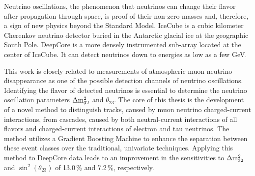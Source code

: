 
Neutrino oscillations, the phenomenon that neutrinos can change their flavor after propagation through space, is proof of their non-zero masses and, therefore, a sign of new physics beyond the Standard Model.
IceCube is a cubic kilometer Cherenkov neutrino detector buried in the Antarctic glacial ice at the geographic South Pole.
DeepCore is a more densely instrumented sub-array located at the center of IceCube.
It can detect neutrinos down to energies as low as a few GeV.

This work is closely related to measurements of atmospheric muon neutrino disappearance as one of the possible detection channels of neutrino oscillations.
Identifying the flavor of detected neutrinos is essential to determine the neutrino oscillation parameters $\Delta \rm{m}^{2}_{32}$ and $\theta_{23}$.
The core of this thesis is the development of a novel method to distinguish tracks, caused by muon neutrino charged-current interactions, from cascades, caused by both neutral-current interactions of all flavors and charged-current interactions of electron and tau neutrinos.
The method utilizes a Gradient Boosting Machine to enhance the separation between these event classes over the traditional, univariate techniques.
Applying this method to DeepCore data leads to an improvement in the sensitivities to $\Delta\rm{m}^{2}_{32}$ and $\sin^{2}(\theta_{23})$ of 13.0\,\% and 7.2\,\%, respectively.
